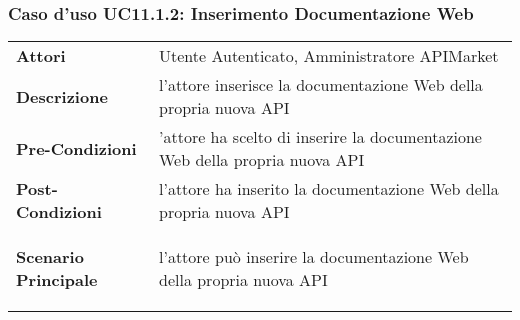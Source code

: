 \subsubsection{Caso d'uso UC11.1.2: Inserimento Documentazione Web}
\label{UC11.1.2}

\renewcommand*{\arraystretch}{1.6}
\begin{longtable}{ l | p{11cm}}
	\hline
	\rowcolor{Gray}
	\multicolumn{2}{c}{UC11.1.2: Inserimento Documentazione Web} \\
	\hline
	\textbf{Attori} &Utente Autenticato, Amministratore APIMarket \\
	\textbf{Descrizione} & l'attore inserisce la documentazione Web della propria nuova API\\
	\textbf{Pre-Condizioni} & 'attore ha scelto di inserire la documentazione Web della propria nuova API\\
	\textbf{Post-Condizioni}&l'attore ha inserito la documentazione Web della propria nuova API\\
	\textbf{Scenario Principale} & \begin{enumerate*}[label=(\arabic*.),itemjoin={\newline}]
		\item l'attore può inserire la documentazione Web della propria nuova API
	\end{enumerate*}\\
\end{longtable}


